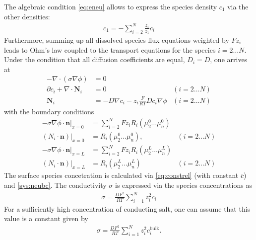 \documentclass[12pt,oneside,reqno]{amsart}
\numberwithin{equation}{section}
\begin{document}
The algebraic condition \ref{eq:eneu} allows to express the species density $c_1$ 
via the other densities:
\begin{align}
  c_1=-\sum_{i=2}^N \frac{z_i}{z_1} c_i
\end{align}
Furthermore, summing up all dissolved species flux equations weighted by $Fz_i$ leads to Ohm's law
coupled to the transport equations for the species $i=2\dots N$. Under the condition that all
diffusion coefficients are equal, $D_i=D$, one arrives at
\begin{subequations}\label{sys:ONP}
\begin{align}
  -\nabla\cdot (\sigma\nabla\phi) &= 0\\
  \partial c_i  + \nabla \cdot \mathbf N_i  &=0 & (i=2\dots N)\\
  \mathbf N_i &= -D \nabla c_i  - z_i \frac{F}{RT}  D c_i \nabla \phi \label{eq:xddflux} & (i=2\dots N)
\end{align}
\end{subequations}
with the boundary conditions
\begin{subequations}\label{ONPbc}
\begin{align}
  -\sigma\nabla\phi \cdot \mathbf n|_{x=0} &= \sum_{i=2}^N Fz_iR_i(\mu_2^0\dots\mu_n^0)\\
  (N_i\cdot \mathbf n)|_{x=0}&=R_i(\mu_2^0\dots\mu_n^0), & (i=2\dots N)\\
  -\sigma\nabla\phi \cdot \mathbf n|_{x=L} &= \sum_{i=2}^N Fz_iR_i(\mu_2^L\dots\mu_n^L)\\
  (N_i\cdot \mathbf n)|_{x=L} &=R_i(\mu_2^L\dots\mu_n^L) & (i=2\dots N)
\end{align}
\end{subequations}
The surface species concetration is calculated via \eqref{eq:constrel} (with constant $\bar c$) and
  \eqref{sys:neubc}.
The  conductivity $\sigma$ is expressed via the species concentrations as
\begin{align}
  \sigma= \frac{DF^2}{RT}\sum_{i=1}^N z_i^2 c_i
\end{align}
For a sufficiently high concentration of conducting salt, one can assume that this value
is a constant given by 
\begin{align}
  \sigma= \frac{DF^2}{RT}\sum_{i=1}^N z_i^2 c_i^{\text{bulk}}.
\end{align}
\end{document}

